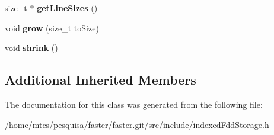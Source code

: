 \begin{DoxyCompactItemize}
\hypertarget{classfaster_1_1indexedFddStorage_3_01K_00_01T_01_5_01_4_a43dbd5e349f514d6fc6875bc400d3061}{}\label{classfaster_1_1indexedFddStorage_3_01K_00_01T_01_5_01_4_a43dbd5e349f514d6fc6875bc400d3061} 
size\+\_\+t $\ast$ {\bfseries get\+Line\+Sizes} ()
\item 
\hypertarget{classfaster_1_1indexedFddStorage_3_01K_00_01T_01_5_01_4_a47a8f1370e5b9c5a5cff40e77b241731}{}\label{classfaster_1_1indexedFddStorage_3_01K_00_01T_01_5_01_4_a47a8f1370e5b9c5a5cff40e77b241731} 
void {\bfseries grow} (size\+\_\+t to\+Size)
\item 
\hypertarget{classfaster_1_1indexedFddStorage_3_01K_00_01T_01_5_01_4_a69e570aeb85d7e3f8e3d2878773e9567}{}\label{classfaster_1_1indexedFddStorage_3_01K_00_01T_01_5_01_4_a69e570aeb85d7e3f8e3d2878773e9567} 
void {\bfseries shrink} ()
\end{DoxyCompactItemize}
\subsection*{Additional Inherited Members}


The documentation for this class was generated from the following file\+:\begin{DoxyCompactItemize}
\item 
/home/mtcs/pesquisa/faster/faster.\+git/src/include/indexed\+Fdd\+Storage.\+h\end{DoxyCompactItemize}
